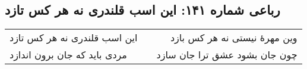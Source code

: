 \begin{center}
\section*{رباعی شماره ۱۴۱: این اسب قلندری نه هر کس تازد}
\label{sec:sh141}
\begin{longtable}{l p{0.5cm} r}
این اسب قلندری نه هر کس تازد
&&
وین مهرهٔ نیستی نه هر کس بازد
\\
مردی باید که جان برون اندازد
&&
چون جان بشود عشق ترا جان سازد
\\
\end{longtable}
\end{center}
